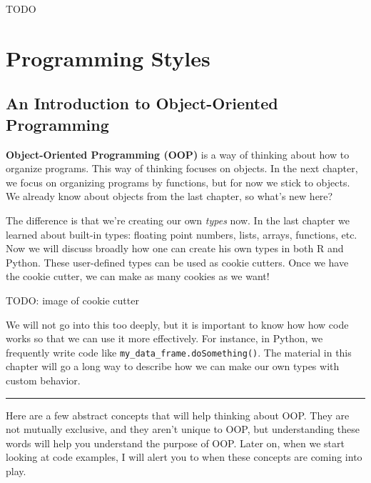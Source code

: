 \documentclass[
  12pt,
  krantz2]{krantz}
\begin{document}
TODO

\hypertarget{part-programming-styles}{%
\part{Programming Styles}\label{part-programming-styles}}

\hypertarget{an-introduction-to-object-oriented-programming}{%
\chapter{An Introduction to Object-Oriented Programming}\label{an-introduction-to-object-oriented-programming}}

\textbf{Object-Oriented Programming (OOP)} is a way of thinking about how to organize programs. This way of thinking focuses on objects. In the next chapter, we focus on organizing programs by functions, but for now we stick to objects. We already know about objects from the last chapter, so what's new here?

The difference is that we're creating our own \emph{types} now. In the last chapter we learned about built-in types: floating point numbers, lists, arrays, functions, etc. Now we will discuss broadly how one can create his own types in both R and Python. These user-defined types can be used as cookie cutters. Once we have the cookie cutter, we can make as many cookies as we want!

TODO: image of cookie cutter

We will not go into this too deeply, but it is important to know how how code works so that we can use it more effectively. For instance, in Python, we frequently write code like \texttt{my\_data\_frame.doSomething()}. The material in this chapter will go a long way to describe how we can make our own types with custom behavior.

\begin{center}\rule{0.5\linewidth}{0.5pt}\end{center}

Here are a few abstract concepts that will help thinking about OOP. They are not mutually exclusive, and they aren't unique to OOP, but understanding these words will help you understand the purpose of OOP. Later on, when we start looking at code examples, I will alert you to when these concepts are coming into play.
\end{document}

